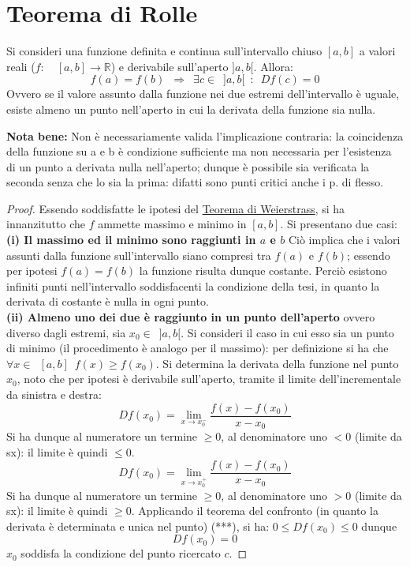 \documentclass[10pt, oneside]{book}
\theoremstyle{plain}
\begin{document}
\section{Teorema di Rolle}
\begin{ther}
Si consideri una funzione definita e continua sull'intervallo chiuso $[a,b]$ a valori reali ($f : \enspace \enspace [a, b] \rightarrow \mathbb{R}$) e derivabile sull'aperto $]a, b[$. Allora:
\[f(a) = f(b) \enspace \Longrightarrow \enspace \exists c \in \enspace ]a, b[ \enspace : \enspace Df(c) = 0\]
Ovvero se il valore assunto dalla funzione nei due estremi dell'intervallo è uguale, esiste almeno un punto nell'aperto in cui la derivata della funzione sia nulla.
\end{ther}
\textbf{Nota bene:} Non è necessariamente valida l'implicazione contraria: la coincidenza della funzione su a e b è condizione sufficiente ma non necessaria per l'esistenza di un punto a derivata nulla nell'aperto; dunque è possibile sia verificata la seconda senza che lo sia la prima: difatti sono punti critici anche i p. di flesso.
\begin{proof}
Essendo soddisfatte le ipotesi del \hyperlink{weierstrass}{Teorema di Weierstrass}, si ha innanzitutto che $f$ ammette massimo e minimo in $[a, b]$. Si presentano due casi:
\textbf{(i) Il massimo ed il minimo sono raggiunti in $a$ e $b$} Ciò implica che i valori assunti dalla funzione sull'intervallo siano compresi tra $f(a)$ e $f(b)$; essendo per ipotesi $f(a) = f(b)$ la funzione risulta dunque costante. Perciò esistono infiniti punti nell'intervallo soddisfacenti la condizione della tesi, in quanto la derivata di costante è nulla in ogni punto. \\
\textbf{(ii) Almeno uno dei due è raggiunto in un punto dell'aperto} ovvero diverso dagli estremi, sia $x_0 \in \enspace ]a, b[$.
Si consideri il caso in cui esso sia un punto di minimo (il procedimento è analogo per il massimo): per definizione si ha che $\forall x \in \enspace [a, b] \enspace f(x) \geq f(x_0)$. Si determina la derivata della funzione nel punto $x_0$, noto che per ipotesi è derivabile sull'aperto, tramite il limite dell'incrementale da sinistra e destra:
\[D f(x_0) = \lim \limits_{x \rightarrow x_0^-} \frac{f(x) - f(x_0)}{x - x_0}\]
Si ha dunque al numeratore un termine $\geq 0$, al denominatore uno $< 0$ (limite da sx): il limite è quindi $\leq 0$.
\[D f(x_0) = \lim \limits_{x \rightarrow x_0^+} \frac{f(x) - f(x_0)}{x - x_0}\]
Si ha dunque al numeratore un termine $\geq 0$, al denominatore uno $> 0$ (limite da sx): il limite è quindi $\geq 0$.
Applicando il teorema del confronto (in quanto la derivata è determinata e unica nel punto) \hypertarget{confr}{(***)}, si ha: $0 \leq Df(x_0) \leq 0$  dunque \[Df(x_0) = 0\]
$x_0$ soddisfa la condizione del punto ricercato $c$.
\end{proof}
\end{document}
